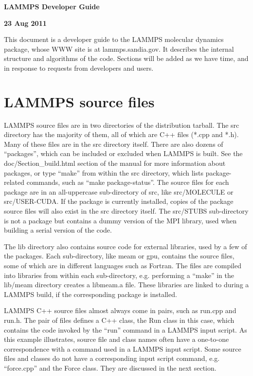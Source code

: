 \documentclass{article}
\begin{document}
\centerline{\Large \bf LAMMPS Developer Guide}
\centerline{\bf 23 Aug 2011}

\vspace{0.5in}

This document is a developer guide to the LAMMPS molecular dynamics
package, whose WWW site is at lammps.sandia.gov.  It describes the
internal structure and algorithms of the code.  Sections will be added
as we have time, and in response to requests from developers and
users.

\tableofcontents

\pagebreak
\section{LAMMPS source files}

LAMMPS source files are in two directories of the distribution
tarball.  The src directory has the majority of them, all of which are
C++ files (*.cpp and *.h).  Many of these files are in the src
directory itself.  There are also dozens of ``packages'', which can be
included or excluded when LAMMPS is built.  See the
doc/Section\_build.html section of the manual for more information
about packages, or type ``make'' from within the src directory, which
lists package-related commands, such as ``make package-status''.  The
source files for each package are in an all-uppercase sub-directory of
src, like src/MOLECULE or src/USER-CUDA.  If the package is currently
installed, copies of the package source files will also exist in the
src directory itself.  The src/STUBS sub-directory is not a package
but contains a dummy version of the MPI library, used when building a
serial version of the code.

The lib directory also contains source code for external libraries,
used by a few of the packages.  Each sub-directory, like meam or gpu,
contains the source files, some of which are in different languages
such as Fortran.  The files are compiled into libraries from within
each sub-directory, e.g. performing a ``make'' in the lib/meam directory
creates a libmeam.a file.  These libraries are linked to during a
LAMMPS build, if the corresponding package is installed.

LAMMPS C++ source files almost always come in pairs, such as run.cpp
and run.h.  The pair of files defines a C++ class, the Run class in
this case, which contains the code invoked by the ``run'' command in a
LAMMPS input script.  As this example illustrates, source file and
class names often have a one-to-one correspondence with a command used
in a LAMMPS input script.  Some source files and classes do not have a
corresponding input script command, e.g. ``force.cpp'' and the Force
class.  They are discussed in the next section.
\end{document}
